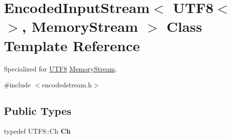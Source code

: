 \hypertarget{a00093}{}\section{Encoded\+Input\+Stream$<$ U\+T\+F8$<$$>$, Memory\+Stream $>$ Class Template Reference}
\label{a00093}


Specialized for \hyperlink{a00333}{U\+T\+F8} \hyperlink{a00224}{Memory\+Stream}.  




{\ttfamily \#include $<$encodedstream.\+h$>$}

\subsection*{Public Types}
\begin{DoxyCompactItemize}
\item 
typedef U\+T\+F8\+::\+Ch {\bfseries Ch}\hypertarget{a00093_a091eb31dd2554bf10054148953f9b3bf}{}\label{a00093_a091eb31dd2554bf10054148953f9b3bf}

\end{DoxyCompactItemize}
